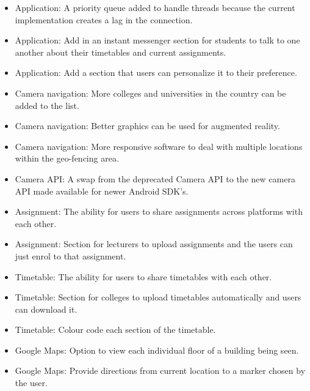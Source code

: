 \begin{itemize}
	\item Application: A priority queue added to handle threads because the current implementation creates a lag in the connection.
	\item Application: Add in an instant messenger section for students to talk to one another about their timetables and current assignments.
	\item Application: Add a section that users can personalize it to their preference.
	
	\item Camera navigation: More colleges and universities in the country can be added to the list.
	\item Camera navigation: Better graphics can be used for augmented reality.
	\item Camera navigation: More responsive software to deal with multiple locations within the geo-fencing area.
	\item Camera API: A swap from the deprecated Camera API to the new camera API made available for newer Android SDK's. 
	
	\item Assignment: The ability for users to share assignments across platforms with each other.
	\item Assignment: Section for lecturers to upload assignments and the users can just enrol to that assignment.
	
	\item Timetable: The ability for users to share timetables with each other.
	\item Timetable: Section for colleges to upload timetables automatically and users can download it.
	\item Timetable: Colour code each section of the timetable.
	
	\item Google Maps: Option to view each individual floor of a building being seen.
	\item Google Maps: Provide directions from current location to a marker chosen by the user.
\end{itemize}

